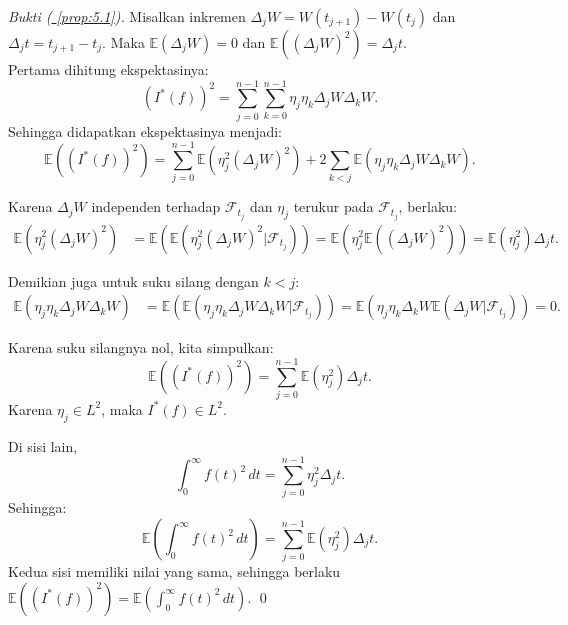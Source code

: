 \documentclass[aspectratio=169,11pt]{beamer}
\theoremstyle{definition}
\newcommand{\myref}[1]{\hyperref[#1]{\nameCref{#1} \ref*{#1}}}
\begin{document}
\begin{frame}[allowframebreaks]{\insertsection}{\insertsubsection}
  \textit{Bukti (\myref{prop:5.1}).} Misalkan inkremen $\Delta_j W = W(t_{j+1}) - W(t_j)$ dan $\Delta_j t = t_{j+1} - t_j$. Maka $\mathbb{E}(\Delta_j W) = 0$ dan $\mathbb{E}((\Delta_j W)^2) = \Delta_j t$.\\
  Pertama dihitung ekspektasinya:
  \begin{equation*}
    (I^*(f))^2 = \sum_{j=0}^{n-1}\sum_{k=0}^{n-1} \eta_j \eta_k \Delta_j W \Delta_k W.
  \end{equation*}
  Sehingga didapatkan ekspektasinya menjadi:
  \begin{equation*}
    \mathbb{E}((I^*(f))^2) = \sum_{j=0}^{n-1} \mathbb{E}(\eta_j^2 (\Delta_j W)^2) + 2 \sum_{k < j} \mathbb{E}(\eta_j \eta_k \Delta_j W \Delta_k W).
  \end{equation*}

  Karena $\Delta_j W$ independen terhadap $\mathcal{F}_{t_j}$ dan $\eta_j$ terukur pada $\mathcal{F}_{t_j}$, berlaku:
  \begin{align*}
    \mathbb{E}(\eta_j^2 (\Delta_j W)^2) & = \mathbb{E}(\mathbb{E}(\eta_j^2 (\Delta_j W)^2 | \mathcal{F}_{t_j}))           = \mathbb{E}(\eta_j^2 \mathbb{E}((\Delta_j W)^2)) = \mathbb{E}(\eta_j^2) \Delta_j t.
  \end{align*}

  Demikian juga untuk suku silang dengan $k < j$:
  \begin{align*}
    \mathbb{E}(\eta_j \eta_k \Delta_j W \Delta_k W) & = \mathbb{E}(\mathbb{E}(\eta_j \eta_k \Delta_j W \Delta_k W | \mathcal{F}_{t_j})) = \mathbb{E}(\eta_j \eta_k \Delta_k W \mathbb{E}(\Delta_j W | \mathcal{F}_{t_j}))= 0.
  \end{align*}

  Karena suku silangnya nol, kita simpulkan:
  \begin{equation*}
    \mathbb{E}((I^*(f))^2) = \sum_{j=0}^{n-1} \mathbb{E}(\eta_j^2) \Delta_j t.
  \end{equation*}
  Karena $\eta_j \in L^2$, maka $I^*(f) \in L^2$.

  Di sisi lain,
  \begin{equation*}
    \int_0^\infty f(t)^2 \, dt = \sum_{j=0}^{n-1} \eta_j^2 \Delta_j t.
  \end{equation*}
  Sehingga:
  \begin{equation*}
    \mathbb{E}\left(\int_0^\infty f(t)^2 \, dt\right) = \sum_{j=0}^{n-1} \mathbb{E}(\eta_j^2) \Delta_j t.
  \end{equation*}
  Kedua sisi memiliki nilai yang sama, sehingga berlaku $\mathbb{E}((I^*(f))^2) = \mathbb{E}\left(\int_0^\infty f(t)^2 \, dt\right)$. \qed
\end{frame}
\end{document}
